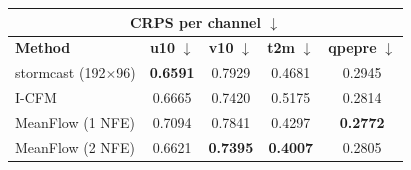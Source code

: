 \documentclass[border=10pt]{standalone}
\begin{document}
\begin{tabular}{lcccc}
\toprule
\multicolumn{5}{c}{\textbf{CRPS per channel} $\downarrow$} \\
\midrule
\textbf{Method} & \textbf{u10} $\downarrow$ & \textbf{v10} $\downarrow$ & \textbf{t2m} $\downarrow$ & \textbf{qpepre} $\downarrow$ \\
\midrule
stormcast (192$\times$96) & \textbf{0.6591} & 0.7929 & 0.4681 & 0.2945 \\
I-CFM & 0.6665 & 0.7420 & 0.5175 & 0.2814 \\
MeanFlow (1 NFE) & 0.7094 & 0.7841 & 0.4297 & \textbf{0.2772} \\
MeanFlow (2 NFE) & 0.6621 & \textbf{0.7395} & \textbf{0.4007} & 0.2805 \\
\bottomrule
\end{tabular}
\end{document}
